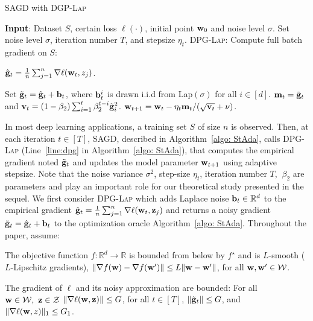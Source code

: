 \documentclass[11pt]{article}
\begin{document}
\begin{algorithm}[t] 
\caption{\textsc{SAGD} with \textsc{DGP-Lap}}
\begin{algorithmic}[1] \label{algo: StAda}
\STATE \textbf{Input}: Dataset $S$,  certain loss $\ell(\cdot)$, initial point $\mathbf{w}_0$ and noise level $\sigma$.
\STATE Set  noise level $\sigma$, iteration number $T$,  and stepsize $\eta_t$.
	\STATE  \textsc{DPG-Lap:} Compute full batch gradient on $S$: \\
	\centerline{ $\hat {\mathbf{g}}_t = \frac{1}{n} \sum_{j=1}^n\nabla \ell(\mathbf{w}_t, z_j)$.}	
	\STATE \label{line:dpg} Set $\tilde {\mathbf{g}}_t = \hat {\mathbf{g}}_t + \mathbf{b}_t$, where $\mathbf{b}_t^i$ is drawn i.i.d from Lap$(\sigma)$ for all $i \in [d]$.
\STATE  \label{line:adap1}
$\mathbf{m}_t = \tilde {\mathbf{g}}_t$ and $\mathbf{v}_t = \left(1-\beta_{2}\right) \sum_{i=1}^{t} \beta_{2}^{t-i} \tilde {\mathbf{g}}_{i}^{2}$.
\STATE  \label{line:adap2} $\mathbf{w}_{t+1}=\mathbf{w}_{t}-\eta_t \mathbf{m}_t /(\sqrt{\mathbf{v}_t}+\nu)$.
\ENDFOR 
\end{algorithmic}
\end{algorithm}
In most deep learning applications, a training set $S$ of size $n$ is observed.
Then, at each iteration $t \in [T]$, \textsc{SAGD}, described in Algorithm~\ref{algo: StAda}, calls \textsc{DPG-Lap} (Line~\ref{line:dpg} in Algorithm~\ref{algo: StAda}), that computes the empirical gradient noted $\tilde {\mathbf{g}}_t$ and updates the model parameter $\mathbf{w}_{t+1}$ using adaptive stepsize.
Note that the noise variance $\sigma^2$, step-size $\eta_t$, iteration number $T$, $~ \beta_2$ are parameters and play an important role for our theoretical study presented in the sequel. 
We first consider \textsc{DPG-Lap} which adds Laplace noise $\mathbf{b}_t \in \mathbb{R}^d$ to the empirical gradient $\hat {\mathbf{g}}_t = \frac{1}{n} \sum_{j=1}^n\nabla \ell(\mathbf{w}_t, \mathbf{z}_j)$ and returns a noisy gradient $\tilde {\mathbf{g}}_t = \hat {\mathbf{g}}_t + \mathbf{b}_t$ to the optimization oracle Algorithm~\ref{algo: StAda}. Throughout the paper, assume:
\begin{assumption}
The objective function $ f: \mathbb{R}^d \rightarrow \mathbb{R}$ is bounded from below by $f^\star$ and is $L$-smooth ($L$-Lipschitz gradients), \ie$\nonumber \|\nabla f(\mathbf{w}) -\nabla f(\mathbf{w}^\prime) \|\leq L \|\mathbf{w}-\mathbf{w}^\prime \|$, for all $\w, \w^\prime \in \cW$.
\end{assumption}
\begin{assumption}
The gradient of $\ell$ and its noisy approximation are bounded: For all $\w \in \cW, \  \z \in \cZ$ $\|\nabla \ell (\mathbf{w}, \mathbf{z}) \| \leq G$, for all $t \in [T]$, $\|\tilde {\mathbf{g}}_t\| \leq G$, and $\|\nabla \ell (\mathbf{w}, z) \|_1 \leq G_1$.
\end{assumption}
\end{document}
